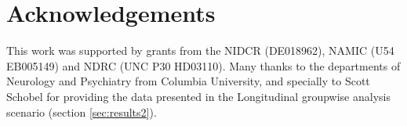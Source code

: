 \documentclass{InsightArticle}
\begin{document}
\section*{Acknowledgements}

This work was supported by grants from the NIDCR (DE018962), NAMIC (U54 EB005149) and NDRC (UNC P30 HD03110). Many thanks to the departments of Neurology and Psychiatry from Columbia University, and specially to Scott Schobel for providing the data presented in the Longitudinal groupwise analysis scenario (section \ref{sec:results2}).

%
%



\end{document}
